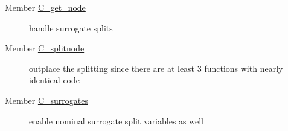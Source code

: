 \label{todo__todo000002}
\hypertarget{todo__todo000002}{}
 \begin{description}
\item[Member \hyperlink{Predict_8c_dcd61d38c7c43d241d09a600b70fe3c5}{C\_\-get\_\-node} ]handle surrogate splits \end{description}


\label{todo__todo000001}
\hypertarget{todo__todo000001}{}
 \begin{description}
\item[Member \hyperlink{Predict_8c_daf8a0eb8790ebf14f0e265de164d50e}{C\_\-splitnode} ]outplace the splitting since there are at least 3 functions with nearly identical code \end{description}


\label{todo__todo000003}
\hypertarget{todo__todo000003}{}
 \begin{description}
\item[Member \hyperlink{SurrogateSplits_8c_fd8931db67339ca2bb679d8d38135275}{C\_\-surrogates} ]enable nominal surrogate split variables as well \end{description}
